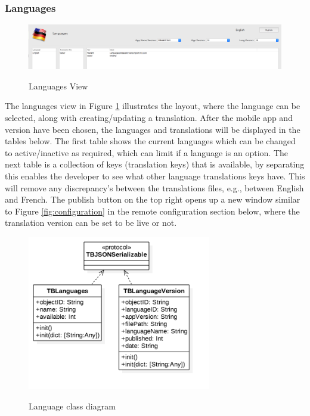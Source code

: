 \subsubsection{Languages}

\begin{figure}[!h]
    \caption{Languages View}
    \centering
    \includegraphics[width=120mm]{images/dashboard/languages}
    \label{fig:languages}
\end{figure} 

The languages view in Figure \ref{fig:languages} illustrates the layout, where the language can be selected, along with creating/updating a translation. After the mobile app and version have been chosen, the languages and translations will be displayed in the tables below. The first table shows the current languages which can be changed to active/inactive as required, which can limit if a language is an option. The next table is a collection of keys (translation keys) that is available, by separating this enables the developer to see what other language translations keys have. This will remove any discrepancy’s between the translations files, e.g., between English and French. The publish button on the top right opens up a new window similar to Figure \ref{fig:configuration} in the remote configuration section below, where the translation version can be set to be live or not.

\begin{figure}[!h]
    \caption{Language class diagram}
    \centering
    \includegraphics[width=80mm]{images/classdiagrams/lang_class}
    \label{fig:lang_class}
\end{figure}


